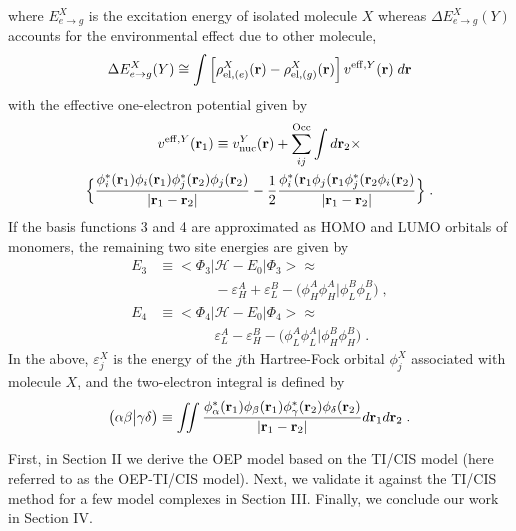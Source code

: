 %
where $E^X_{e\rightarrow g}$ is the excitation energy of isolated molecule $X$ whereas 
$\Delta E^X_{e\rightarrow g}(Y)$ accounts for the environmental effect due to other molecule,
%
\begin{equation}
 \Delta E^X_{e\rightarrow g}(Y) \cong \int \left[ \rho^{X}_{{\rm el},(e)}({\bf r}) - \rho^{X}_{{\rm el},(g)}({\bf r}) \right]
         v^{{\rm eff},Y}({\bf r}) \; d{\bf r}
\end{equation}
%
with the effective one\hyp{}electron potential given by
%
\begin{multline}
 v^{{\rm eff},Y}({\bf r}_1) \equiv v^{Y}_{\rm nuc}({\bf r})
  + \sum_{ij}^{\rm Occ} \int d{\bf r}_2 \times \\
 \Big\{
 \frac{\phi_i^*({\bf r}_1) \phi_i({\bf r}_1)
                    \phi_j^*({\bf r}_2) \phi_j({\bf r}_2)}{\vert {\bf r}_1 - {\bf r}_2 \vert}
  - \frac{1}{2}
   \frac{\phi_i^*({\bf r}_1 \phi_j({\bf r}_1 
                 \phi_j^*({\bf r}_2 \phi_i({\bf r}_2)}{\vert {\bf r}_1 - {\bf r}_2 \vert}
  \Big\} \;.
\end{multline}
%
If the basis functions 3 and 4 are approximated as HOMO and LUMO orbitals of monomers,
the remaining two site energies are given by
%
\begin{subequations}
\begin{align}
 E_3 &\equiv \big< \Phi_3 \big| \mathscr{H} -E_{0} \big| \Phi_3 \big> \approx \nonumber \\ 
 &\qquad\qquad -\varepsilon_H^A + \varepsilon_L^B - \big( \phi_H^A \phi_H^A \big| \phi_L^B \phi_L^B \big)  \;, \\
 E_4 &\equiv \big< \Phi_4 \big| \mathscr{H} -E_{0} \big| \Phi_4 \big> \approx \nonumber \\
 &\qquad\qquad \varepsilon_L^A - \varepsilon_H^B - \big( \phi_L^A \phi_L^A \big| \phi_H^B \phi_H^B \big)  \;.
\end{align}
\end{subequations}
%
In the above, $\varepsilon_j^X$ is the energy of the $j$th Hartree-Fock orbital $\phi_j^X$ associated with molecule $X$,
and the two\hyp{}electron integral is defined by
%
\begin{equation}
	\bigl( {\alpha\beta} \bigl\lvert {\gamma\delta} \bigr) \equiv
	\iint 
	\frac{ \phi_\alpha^{*}({\bf r}_1) \phi_\beta({\bf r}_1) 
	       \phi_\gamma^{*}({\bf r}_2) \phi_\delta({\bf r}_2) }{ \vert {\bf r}_1 - {\bf r}_2 \vert}
	d{\bf r}_1 d{\bf r}_2  \;.
\end{equation}
%

First, in Section II we derive the OEP model based on the TI/CIS model (here referred to as the
OEP-TI/CIS model). Next, we validate it against the TI/CIS method for a few model complexes
in Section III. 
Finally, we conclude our work in Section IV.

